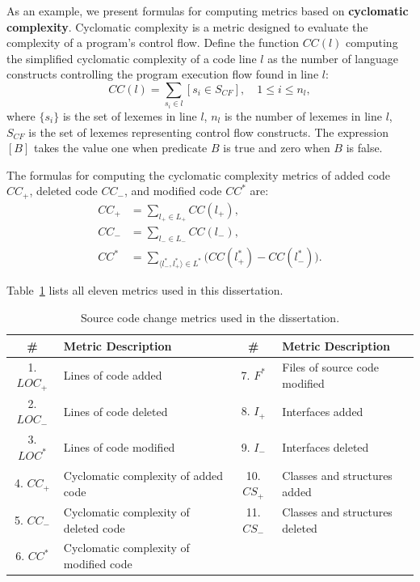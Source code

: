\documentclass[11pt,a4paper]{article}
\begin{document}
As an example, we present formulas for computing metrics based on \textbf{cyclomatic complexity}. Cyclomatic complexity is a metric designed to evaluate the complexity of a program's control flow. Define the function $CC(l)$ computing the simplified cyclomatic complexity of a code line $l$ as the number of language constructs controlling the program execution flow found in line $l$:
\begin{equation}
    CC(l) = \sum_{s_i \in l} [s_i \in S_{CF}], \quad 1 \le i \le n_l,
\end{equation}
where $\{s_i\}$ is the set of lexemes in line $l$, $n_l$ is the number of lexemes in line $l$, $S_{CF}$ is the set of lexemes representing control flow constructs. The expression $[B]$ takes the value one when predicate $B$ is true and zero when $B$ is false.

The formulas for computing the cyclomatic complexity metrics of added code $CC_+$, deleted code $CC_-$, and modified code $CC^*$ are:
\begin{align}
    CC_+ &= \sum_{l_+ \in L_+} CC(l_+), \\
    CC_- &= \sum_{l_- \in L_-} CC(l_-), \\
    CC^* &= \sum_{\langle l^*_-, l^*_+ \rangle \in L^*} \bigl(CC(l^*_+) - CC(l^*_-)\bigr).
\end{align}

Table~\ref{tab:metrics} lists all eleven metrics used in this dissertation.

\begin{table}[ht]
\centering
\caption{Source code change metrics used in the dissertation.}
\label{tab:metrics}
\begin{tabular}{@{}clcl@{}}
\toprule
\# & Metric Description & \# & Metric Description \\
\midrule
1. $LOC_+$ & Lines of code added       & 7. $F^*$ & Files of source code modified \\
2. $LOC_-$ & Lines of code deleted     & 8. $I_+$ & Interfaces added \\
3. $LOC^*$ & Lines of code modified    & 9. $I_-$ & Interfaces deleted \\
4. $CC_+$  & Cyclomatic complexity of added code   & 10. $CS_+$ & Classes and structures added \\
5. $CC_-$  & Cyclomatic complexity of deleted code  & 11. $CS_-$ & Classes and structures deleted \\
6. $CC^*$  & Cyclomatic complexity of modified code & & \\
\bottomrule
\end{tabular}
\end{table}
\end{document}
